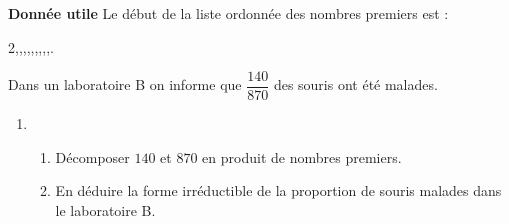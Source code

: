\documentclass[10pt]{article}
\begin{document}
\textbf{Donnée utile} Le début de la liste ordonnée des nombres premiers est : 
		
		2,,,,,,,,,.
		
Dans un laboratoire B on informe que $\dfrac{140}{870}$ des souris ont été malades.

\begin{enumerate}[resume]		
\item  
	\begin{enumerate}
		\item Décomposer $140$ et $870$ en produit de nombres premiers.
		\item En déduire la forme irréductible de la proportion de souris malades dans le laboratoire B.
	\end{enumerate}
\end{enumerate}

\vspace{0,5cm}
\end{document}

